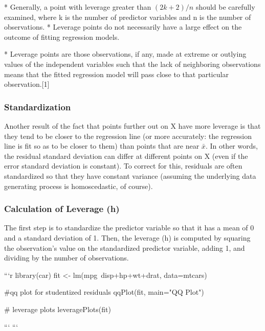 * Generally, a point with leverage greater than $(2k+2)/n$ should be carefully examined, where k is the number of predictor variables and n is the number of observations.
*  Leverage points do not necessarily have a large effect on the outcome of fitting regression models.

* Leverage points are those observations, if any, made at extreme or outlying values of the independent variables such that the lack of neighboring observations means that the fitted regression model will pass close to that particular observation.[1]




\subsubsection{Standardization}
Another result of the fact that points further out on X have more leverage is that they tend to be closer to the regression line (or more accurately: the regression line is fit so as to be closer to them) than points that are near $\bar{x}$. In other words, the residual standard deviation can differ at different points on X (even if the error standard deviation is constant). To correct for this, residuals are often standardized so that they have constant variance (assuming the underlying data generating process is homoscedastic, of course).


\subsubsection{Calculation of Leverage (h)}
The first step is to standardize the predictor variable so that it has a mean of 0 and a standard deviation of 1. 
Then, the leverage (h) is computed by squaring the observation's value on the standardized predictor variable, adding 1, 
and dividing by the number of observations.

\newpage


```{r}
library(car)
fit <- lm(mpg~disp+hp+wt+drat, data=mtcars) 

#qq plot for studentized residuals
qqPlot(fit, main="QQ Plot")  

# leverage plots
leveragePlots(fit) 

```
```

